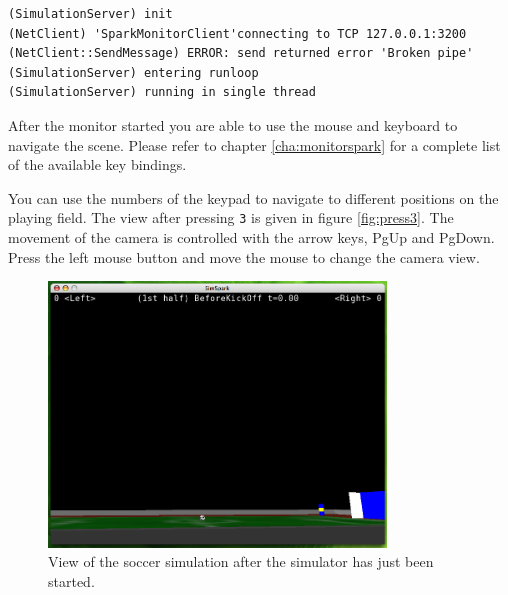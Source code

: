 \begin{itemize}
\begin{verbatim}
(SimulationServer) init
(NetClient) 'SparkMonitorClient'connecting to TCP 127.0.0.1:3200
(NetClient::SendMessage) ERROR: send returned error 'Broken pipe'
(SimulationServer) entering runloop
(SimulationServer) running in single thread
\end{verbatim}

After the monitor started you are able to use the mouse and keyboard
to navigate the scene. Please refer to chapter
\ref{cha:monitorspark} for a complete list of the available key bindings. 

You can use the numbers of the keypad to navigate to different
positions on the playing field. The view after pressing \texttt{3} is
given in figure \ref{fig:press3}. The movement of the camera is
controlled with the arrow keys, PgUp and PgDown. Press the left mouse
button and move the mouse to change the camera view.


\begin{figure}[htbp]
\begin{center}
\includegraphics[width=0.8\textwidth]{fig/startup}
\caption{View of the soccer simulation after the simulator has just been started.}
\label{fig:startup}
\end{center}
\end{figure}


\end{itemize}
